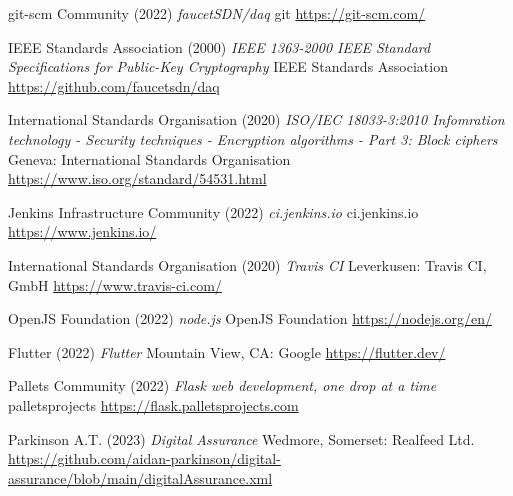\documentclass[11pt, oneside]{article}   	%
\begin{document}
\begin{thebibliography}{99}
 git-scm Community (2022)
\emph{faucetSDN/daq}
git
\url{https://git-scm.com/}

 IEEE Standards Association (2000)
\emph{IEEE 1363-2000 IEEE Standard Specifications for Public-Key Cryptography}
IEEE Standards Association
\url{https://github.com/faucetsdn/daq}

 International Standards Organisation (2020)
\emph{ISO/IEC 18033-3:2010 Infomration technology - Security techniques - Encryption algorithms - Part 3: Block ciphers}
Geneva: International Standards Organisation
\url{https://www.iso.org/standard/54531.html}

 Jenkins Infrastructure Community (2022)
\emph{ci.jenkins.io}
ci.jenkins.io
\url{https://www.jenkins.io/}

 International Standards Organisation (2020)
\emph{Travis CI}
Leverkusen: Travis CI, GmbH
\url{https://www.travis-ci.com/}


 OpenJS Foundation (2022)
\emph{node.js}
OpenJS Foundation
\url{https://nodejs.org/en/}

 Flutter (2022)
\emph{Flutter}
Mountain View, CA: Google 
\url{https://flutter.dev/}

 Pallets Community (2022)
\emph{Flask web development, one drop at a time}
palletsprojects
\url{https://flask.palletsprojects.com}

 Parkinson A.T. (2023)
\emph{Digital Assurance}
Wedmore, Somerset: Realfeed Ltd.
\url{https://github.com/aidan-parkinson/digital-assurance/blob/main/digitalAssurance.xml}

\end{thebibliography}

\newpage
\thispagestyle{empty}
\mbox{}
\newpage
\end{document}

